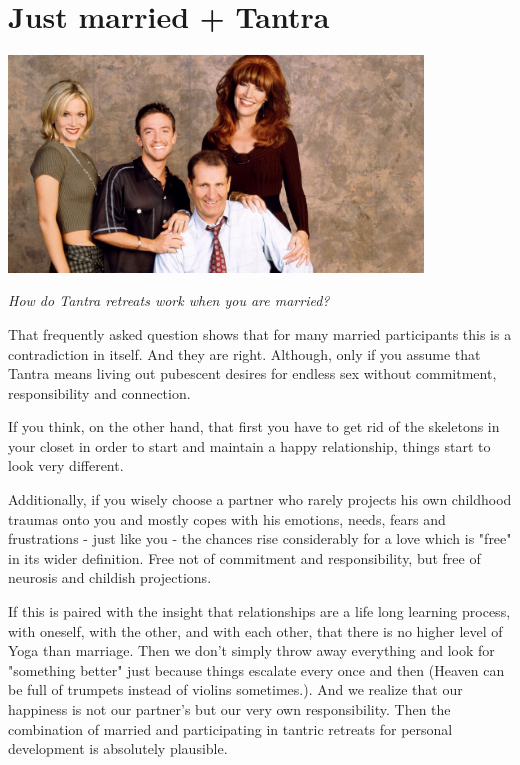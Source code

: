 \section{Just married + Tantra}

\begin{center}
\includegraphics[width=11cm]{images/16_married.jpg}
\end{center}

\textit{How do Tantra retreats work when you are married?}

That frequently asked question shows that for many married participants this is a contradiction in itself. And they are right. Although, only if you assume that Tantra means living out pubescent desires for endless sex without commitment, responsibility and connection.

If you think, on the other hand, that first you have to get rid of the skeletons in your closet in order to start and maintain a happy relationship, things start to look very different.

Additionally, if you wisely choose a partner who rarely projects his own childhood traumas onto you and mostly  copes with his emotions, needs, fears and frustrations - just like you -  the chances rise considerably for a love which is "free" in its wider definition. Free not of commitment and responsibility, but free of neurosis and childish projections.

If this is paired with the insight that relationships are a life long learning process, with oneself, with the other, and with each other, that there is no higher level of Yoga than marriage. Then we don't simply throw away everything and look for "something better" just because things escalate every once and then (Heaven can be full of trumpets instead of violins sometimes.). And we realize that our happiness is not our partner's but our very own responsibility. Then the combination of married and participating in tantric retreats for personal development is absolutely plausible. 

